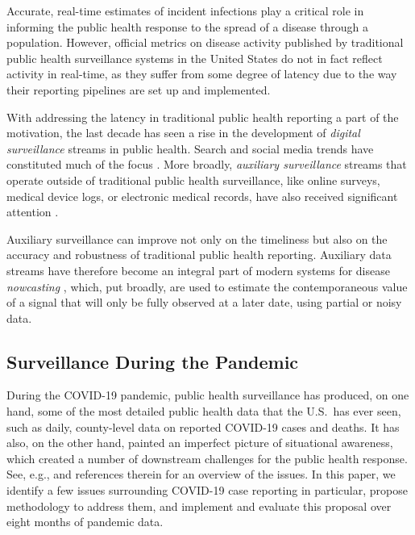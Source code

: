 \documentclass[sts]{imsart}
\theoremstyle{plain}
\theoremstyle{definition}
\theoremstyle{remark}
\begin{document}
Accurate, real-time estimates of incident infections play a critical role in
informing the public health response to the spread of a disease through a
population. However, official metrics on disease activity published by
traditional public health surveillance systems in the United States do not in
fact reflect activity in real-time, as they suffer from some degree of latency
due to the way their reporting pipelines are set up and implemented.

With addressing the latency in traditional public health reporting a part of the
motivation, the last decade has seen a rise in the development of \emph{digital
  surveillance} streams in public health. Search and social media trends have
constituted much of the focus \citep[e.g.,][]{Brownstein:2009, Ginsberg:2009,
Salathe:2012, Kass-Hout:2013, Paul:2017}. More broadly, \emph{auxiliary
surveillance} streams that operate outside of traditional public health
surveillance, like online surveys, medical device logs, or electronic medical 
records, have also received significant attention
\citep[e.g.,][]{Kass-Hout:2011, Carlson:2013, Viboud:2014, Smolinski:2015,
Santillana:2016, Charu:2017, Yang:2019, Ackley:2020, Leuba:2020, Radin:2020}.

Auxiliary surveillance can improve not only on the timeliness but also on the  
accuracy and robustness of traditional public health reporting. 
Auxiliary data streams have therefore become an integral part of modern systems for
disease \emph{nowcasting} \citep[e.g.,][]{McIver:2014, Santillana:2015,
  Yang:2015, Farrow:2016, Jahja:2019, Brooks:2020}, which, put broadly, are used
to estimate the contemporaneous value of a signal that will only be fully
observed at a later date, using partial or noisy data.    

\subsection{Surveillance During the Pandemic}

During the COVID-19 pandemic, public health surveillance has produced, on one
hand, some of the most detailed public health data that the U.S.\ has ever seen,
such as daily, county-level data on reported COVID-19 cases and deaths. It has
also, on the other hand, painted an imperfect picture of situational awareness,
which created a number of downstream challenges for the public health 
response. See, e.g., \citet{Rosenfeld:2021} and references therein for an
overview of the issues. In this paper, we identify a few issues surrounding
COVID-19 case reporting in particular, propose methodology to address 
them, and implement and evaluate this proposal over eight months of pandemic
data.   
\end{document}
